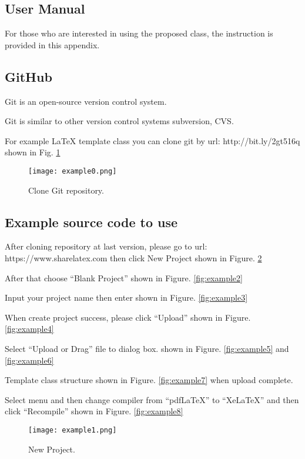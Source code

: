 \begin{appendices}
\section{User Manual}
For those who are interested in using the proposed class, the instruction is provided in this appendix.

\subsection{GitHub}
Git is an open-source version control system.  

Git is similar to other version control systems subversion, CVS.

For example \LaTeX{} template class you can clone git by url: http://bit.ly/2gt516q shown in Fig. \ref{fig:example0}

\begin{figure}[h]
  \centering
  \texttt{[image: example0.png]}
  \caption{Clone Git repository.}
  \label{fig:example0}
\end{figure}

\subsection{Example source code to use}
After cloning repository at last version, please go to url: https://www.sharelatex.com then click New Project shown in Figure. \ref{fig:example1}

After that choose “Blank Project” shown in Figure. \ref{fig:example2} 

Input your project name then enter shown in Figure. \ref{fig:example3}

When create project success, please click “Upload” shown in Figure. \ref{fig:example4}

Select “Upload or Drag” file to dialog box. shown in Figure. \ref{fig:example5} and \ref{fig:example6}

Template class structure shown in Figure. \ref{fig:example7} when upload complete.

Select menu and then change compiler from “pdfLaTeX” to “XeLaTeX” and then click “Recompile” shown in Figure. \ref{fig:example8}

\begin{figure}[t!]
  \centering
  \texttt{[image: example1.png]}
  \caption{New Project.}
  \label{fig:example1}
\end{figure}


\end{appendices}
